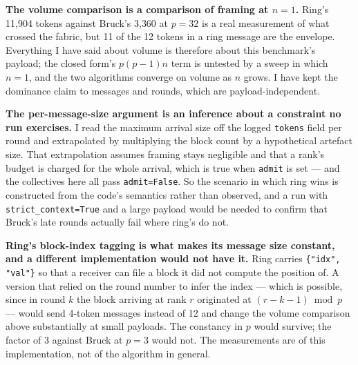 \documentclass[11pt]{article}
\begin{document}
\textbf{The volume comparison is a comparison of framing at $n=1$.} Ring's 11{,}904 tokens against
Bruck's 3{,}360 at $p=32$ is a real measurement of what crossed the fabric, but 11 of the 12
tokens in a ring message are the envelope. Everything I have said about volume is therefore about
this benchmark's payload; the closed form's $p(p-1)n$ term is untested by a sweep in which
$n = 1$, and the two algorithms converge on volume as $n$ grows. I have kept the dominance claim
to messages and rounds, which are payload-independent.

\textbf{The per-message-size argument is an inference about a constraint no run exercises.} I read
the maximum arrival size off the logged \texttt{tokens} field per round and extrapolated by
multiplying the block count by a hypothetical artefact size. That extrapolation assumes framing
stays negligible and that a rank's budget is charged for the whole arrival, which is true when
\texttt{admit} is set --- and the collectives here all pass \texttt{admit=False}. So the scenario
in which ring wins is constructed from the code's semantics rather than observed, and a run with
\texttt{strict\_context=True} and a large payload would be needed to confirm that Bruck's late
rounds actually fail where ring's do not.

\textbf{Ring's block-index tagging is what makes its message size constant, and a different
implementation would not have it.} Ring carries \texttt{\{"idx", "val"\}} so that a receiver can
file a block it did not compute the position of. A version that relied on the round number to
infer the index --- which is possible, since in round $k$ the block arriving at rank $r$
originated at $(r-k-1) \bmod p$ --- would send 4-token messages instead of 12 and change the
volume comparison above substantially at small payloads. The constancy in $p$ would survive; the
factor of 3 against Bruck at $p=3$ would not. The measurements are of this implementation, not of
the algorithm in general.
\end{document}
